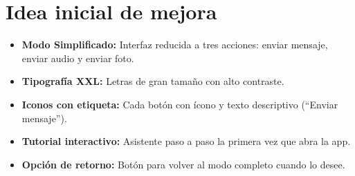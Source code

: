 \documentclass{article}
\begin{document}
\section*{Idea inicial de mejora}
\begin{itemize}
  \item \textbf{Modo Simplificado:} Interfaz reducida a tres acciones: enviar mensaje, enviar audio y enviar foto.
  \item \textbf{Tipografía XXL:} Letras de gran tamaño con alto contraste.
  \item \textbf{Iconos con etiqueta:} Cada botón con ícono y texto descriptivo (“Enviar mensaje”).
  \item \textbf{Tutorial interactivo:} Asistente paso a paso la primera vez que abra la app.
  \item \textbf{Opción de retorno:} Botón para volver al modo completo cuando lo desee.
\end{itemize}
\end{document}
